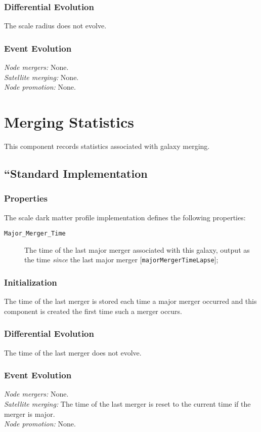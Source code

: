 \subsubsection{Differential Evolution}

The scale radius does not evolve.

\subsubsection{Event Evolution}

\noindent\emph{Node mergers:} None.\\

\noindent\emph{Satellite merging:} None.\\

\noindent\emph{Node promotion:} None.\\

\section{Merging Statistics}

This component records statistics associated with galaxy merging.

\subsection{``Standard Implementation}

\subsubsection{Properties}

The scale dark matter profile implementation defines the following properties:
\begin{description}
 \item [{\tt Major\_Merger\_Time}] The time of the last major merger associated with this galaxy, output as the time \emph{since} the last major merger [{\tt majorMergerTimeLapse}];
\end{description}

\subsubsection{Initialization}

The time of the last merger is stored each time a major merger occurred and this component is created the first time such a merger occurs.

\subsubsection{Differential Evolution}

The time of the last merger does not evolve.

\subsubsection{Event Evolution}

\noindent\emph{Node mergers:} None.\\

\noindent\emph{Satellite merging:} The time of the last merger is reset to the current time if the merger is major.\\

\noindent\emph{Node promotion:} None.\\

